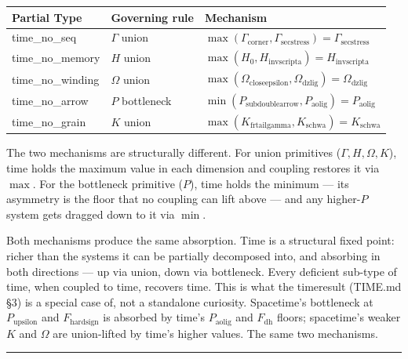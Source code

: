 \documentclass[12pt,a4paper]{article}
\newcommand{\pilcrow}{\S}
\begin{document}
\begin{table}[htbp]
\centering
\small
{}
\begin{tabularx}{\textwidth}{>{\centering\arraybackslash}X >{\centering\arraybackslash}X >{\centering\arraybackslash}X}
\toprule
\rowcolor{gray!25}\textbf{Partial Type} & \textbf{Governing rule} & \textbf{Mechanism} \\
\midrule
\rowcolors{1}{white}{gray!10}
time\_no\_seq & $\Gamma$ union & $\max(\Gamma_{\text{corner}}, \Gamma_{\text{secstress}}) = \Gamma_{\text{secstress}}$ \\
time\_no\_memory & $H$ union & $\max(H_0, H_{\text{invscripta}}) = H_{\text{invscripta}}$ \\
time\_no\_winding & $\Omega$ union & $\max(\Omega_{\text{closeepsilon}}, \Omega_{\text{dzlig}}) = \Omega_{\text{dzlig}}$ \\
time\_no\_arrow & $P$ bottleneck & $\min(P_{\text{subdoublearrow}}, P_{\text{aolig}}) = P_{\text{aolig}}$ \\
time\_no\_grain & $K$ union & $\max(K_{\text{frtailgamma}}, K_{\text{schwa}}) = K_{\text{schwa}}$ \\
\bottomrule
\end{tabularx}
\end{table}

The two mechanisms are structurally different. For union primitives ($\Gamma, H, \Omega, K$), time holds the maximum value in each dimension and coupling restores it via $\max$. For the bottleneck primitive ($P$), time holds the minimum --- its asymmetry is the floor that no coupling can lift above --- and any higher-$P$ system gets dragged down to it via $\min$.

Both mechanisms produce the same absorption. Time is a structural fixed point: richer than the systems it can be partially decomposed into, and absorbing in both directions --- up via union, down via bottleneck. Every deficient sub-type of time, when coupled to time, recovers time. This is what the time\otimesspacetime result (TIME.md \pilcrow{}3) is a special case of, not a standalone curiosity. Spacetime's bottleneck at $P_{\text{upsilon}}$ and $F_{\text{hardsign}}$ is absorbed by time's $P_{\text{aolig}}$ and $F_{\text{dh}}$ floors; spacetime's weaker $K$ and $\Omega$ are union-lifted by time's higher values. The same two mechanisms.

\begin{center}
\rule{0.5\textwidth}{0.4pt}
\end{center}
\end{document}
